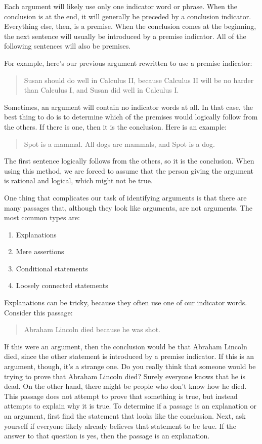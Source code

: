 \documentclass[../logic-text.tex]{subfiles}
\begin{document}
Each argument will likely use only one indicator word or phrase. When the conclusion is at the end, it will generally be preceded by a conclusion indicator. Everything else, then, is a premise. When the conclusion comes at the beginning, the next sentence will usually be introduced by a premise indicator. All of the following sentences will also be premises.

For example, here's our previous argument rewritten to use a premise indicator:

\begin{quote}
Susan should do well in Calculus II, because Calculus II will be no harder than Calculus I, and Susan did well in Calculus I.
\end{quote}

Sometimes, an argument will contain no indicator words at all. In that case, the best thing to do is to determine which of the premises would logically follow from the others. If there is one, then it is the conclusion. Here is an example:

\begin{quote}
Spot is a mammal. All dogs are mammals, and Spot is a dog.
\end{quote}

The first sentence logically follows from the others, so it is the conclusion. When using this method, we are forced to assume that the person giving the argument is rational and logical, which might not be true.

One thing that complicates our task of identifying arguments is that there are many passages that, although they look like arguments, are not arguments. The most common types are:

\begin{enumerate}
\item Explanations
\item Mere assertions
\item Conditional statements
\item Loosely connected statements
\end{enumerate}

Explanations can be tricky, because they often use one of our indicator words. Consider this passage:

\begin{quote}
Abraham Lincoln died because he was shot.
\end{quote}

If this were an argument, then the conclusion would be that Abraham Lincoln died, since the other statement is introduced by a premise indicator. If this is an argument, though, it's a strange one. Do you really think that someone would be trying to prove that Abraham Lincoln died? Surely everyone knows that he is dead. On the other hand, there might be people who don't know how he died. This passage does not attempt to prove that something is true, but instead attempts to explain why it is true. To determine if a passage is an explanation or an argument, first find the statement that looks like the conclusion. Next, ask yourself if everyone likely already believes that statement to be true. If the answer to that question is yes, then the passage is an explanation.
\end{document}
